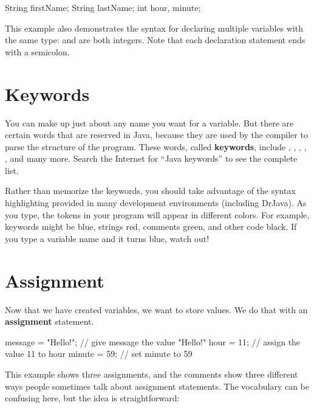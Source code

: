 \begin{code}
    String firstName;
    String lastName;
    int hour, minute;
\end{code}

This example also demonstrates the syntax for declaring multiple variables with the same type:  and  are both integers.
Note that each declaration statement ends with a semicolon.


\section{Keywords}

You can make up just about any name you want for a variable.
But there are certain words that are reserved in Java, because they are used by the compiler to parse the structure of the program.
These words, called {\bf keywords}, include , , , , , and many more.
Search the Internet for ``Java keywords'' to see the complete list.


Rather than memorize the keywords, you should take advantage of the syntax highlighting provided in many development environments (including DrJava).
As you type, the tokens in your program will appear in different colors.
For example, keywords might be blue, strings red, comments green, and other code black.
If you type a variable name and it turns blue, watch out!


\section{Assignment}


Now that we have created variables, we want to store values.
We do that with an {\bf assignment} statement.

\begin{code}
    message = "Hello!";  // give message the value "Hello!"
    hour = 11;           // assign the value 11 to hour
    minute = 59;         // set minute to 59
\end{code}

This example shows three assignments, and the comments show three different ways people sometimes talk about assignment statements.
The vocabulary can be confusing here, but the idea is straightforward:


